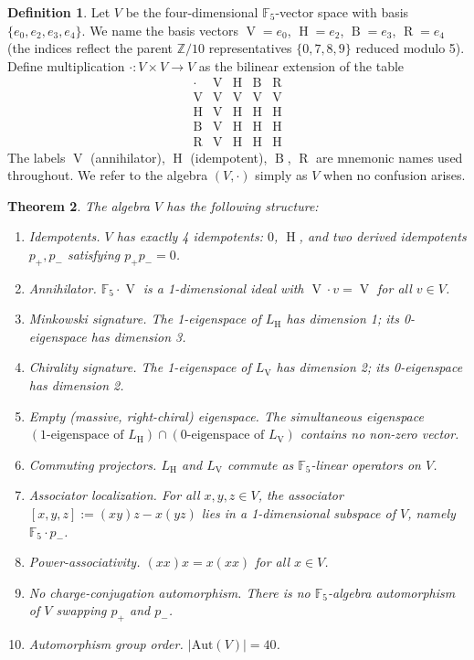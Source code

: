 \documentclass[11pt,reqno]{amsart}
\theoremstyle{plain}
\newtheorem{theorem}{Theorem}[section]
\theoremstyle{definition}
\newtheorem{definition}[theorem]{Definition}
\theoremstyle{remark}
\newcommand{\Z}{\mathbb{Z}}
\newcommand{\F}{\mathbb{F}}
\newcommand{\Aut}{\mathrm{Aut}}
\DeclareMathOperator{\HARM}{H}    %
\DeclareMathOperator{\VOID}{V}    %
\DeclareMathOperator{\BREATH}{B}  %
\DeclareMathOperator{\RESET}{R}   %
\begin{document}
\begin{definition}\label{def:V}
Let $V$ be the four-dimensional $\F_5$-vector space with basis
$\{e_0, e_2, e_3, e_4\}$. We name the basis vectors
$\VOID = e_0$, $\HARM = e_2$, $\BREATH = e_3$, $\RESET = e_4$ (the
indices reflect the parent $\Z/10$ representatives $\{0,7,8,9\}$
reduced modulo 5). Define multiplication $\cdot: V \times V \to V$ as the
bilinear extension of the table
\begin{equation}\label{eq:CL-table}
\begin{array}{c|cccc}
\cdot & \VOID & \HARM & \BREATH & \RESET \\ \hline
\VOID & \VOID & \VOID & \VOID & \VOID \\
\HARM & \VOID & \HARM & \HARM & \HARM \\
\BREATH & \VOID & \HARM & \HARM & \HARM \\
\RESET & \VOID & \HARM & \HARM & \HARM
\end{array}
\end{equation}
The labels $\VOID$ (annihilator), $\HARM$ (idempotent), $\BREATH$,
$\RESET$ are mnemonic names used throughout. We refer to the algebra
$(V, \cdot)$ simply as $V$ when no confusion arises.
\end{definition}

\begin{theorem}\label{thm:dirac}
The algebra $V$ has the following structure:
\begin{enumerate}
\item \emph{Idempotents.} $V$ has exactly 4 idempotents: $0$, $\HARM$, and
two derived idempotents $p_+, p_-$ satisfying $p_+ p_- = 0$.
\item \emph{Annihilator.} $\F_5 \cdot \VOID$ is a 1-dimensional ideal
with $\VOID \cdot v = \VOID$ for all $v \in V$.
\item \emph{Minkowski signature.} The 1-eigenspace of $L_{\HARM}$ has
dimension 1; its 0-eigenspace has dimension 3.
\item \emph{Chirality signature.} The 1-eigenspace of $L_{\VOID}$ has
dimension 2; its 0-eigenspace has dimension 2.
\item \emph{Empty (massive, right-chiral) eigenspace.} The simultaneous
eigenspace $(\text{1-eigenspace of } L_{\HARM}) \cap
(\text{0-eigenspace of } L_{\VOID})$ contains no non-zero vector.
\item \emph{Commuting projectors.} $L_{\HARM}$ and $L_{\VOID}$ commute
as $\F_5$-linear operators on $V$.
\item \emph{Associator localization.} For all $x,y,z \in V$, the
associator $[x,y,z] := (xy)z - x(yz)$ lies in a 1-dimensional subspace
of $V$, namely $\F_5 \cdot p_-$.
\item \emph{Power-associativity.} $(xx)x = x(xx)$ for all $x \in V$.
\item \emph{No charge-conjugation automorphism.} There is no
$\F_5$-algebra automorphism of $V$ swapping $p_+$ and $p_-$.
\item \emph{Automorphism group order.} $|\Aut(V)| = 40$.
\end{enumerate}
\end{theorem}
\end{document}
